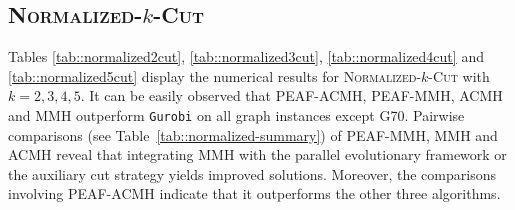 \documentclass[12pt, a4paper]{article}%
\numberwithin{equation}{section}
\theoremstyle{plain}
\newcommand{\blue}{\textcolor{blue}}
\begin{document}
			
			
			
			
			
			
			
			
			
			
			
			
			
			\subsection{\textsc{Normalized}-$k$-\textsc{Cut}}
			
			
			
			
			
			Tables \ref{tab::normalized2cut}, \ref{tab::normalized3cut}, \ref{tab::normalized4cut} and 
			\ref{tab::normalized5cut} display the numerical results for \textsc{Normalized}-$k$-\textsc{Cut} with $k=2,3,4,5$. It can be easily observed that PEAF-ACMH, PEAF-MMH, ACMH and MMH outperform \texttt{Gurobi} on all graph instances except G70. Pairwise comparisons (see Table~\ref{tab::normalized-summary}) of PEAF-MMH, MMH and ACMH reveal that integrating MMH with the parallel evolutionary framework or the auxiliary cut strategy yields improved solutions. Moreover, the comparisons involving PEAF-ACMH indicate that it outperforms the other three algorithms.
			
			
			
\end{document}

